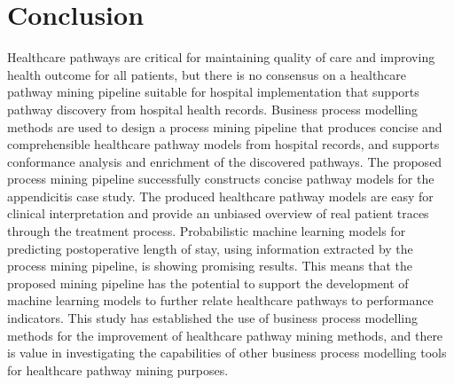 \section{Conclusion}
Healthcare pathways are critical for maintaining quality of care and
improving health outcome for all patients, but there is no consensus
on a healthcare pathway mining pipeline suitable for hospital
implementation that supports pathway discovery from hospital health
records.
Business process modelling methods are used to design a process mining
pipeline that produces concise and comprehensible healthcare pathway
models from hospital records, and supports conformance analysis and
enrichment of the discovered pathways.
The proposed process mining pipeline successfully constructs concise
pathway models for the appendicitis case study.
The produced healthcare pathway models are easy for clinical
interpretation and provide an unbiased overview of real patient traces
through the treatment process.
Probabilistic machine learning models for predicting postoperative
length of stay, using information extracted by the process mining
pipeline, is showing promising results.
This means that the proposed mining pipeline has the potential to
support the development of machine learning models to further relate
healthcare pathways to performance indicators.
This study has established the use of business process modelling methods for the improvement of healthcare pathway mining methods, and there is value in investigating the capabilities of other business process modelling tools for healthcare pathway mining purposes.

